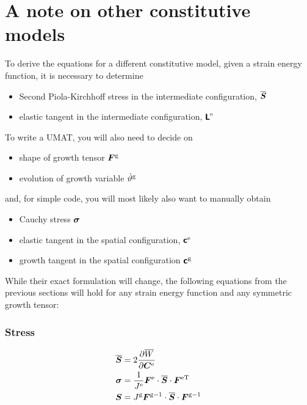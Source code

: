 \documentclass[10pt,letterpaper,oneside]{report}
\newcommand{\ten}[1]{\mbox{\boldmath $#1$}{}}
\newcommand{\tenf}[1]{\mbox{{\sffamily{\bfseries {#1}}}}}
\newcommand{\scas}[1]{\mbox{{\scriptsize{${\rm{#1}}$}}}{}}
\begin{document}
\section{A note on other constitutive models}
To derive the equations for a different constitutive model, given a strain energy function, it is necessary to determine
\begin{itemize}
\item Second Piola-Kirchhoff stress in the intermediate configuration, $\overline{ \ten{S} }$
\item elastic tangent in the intermediate configuration, $\tenf{L}^{\scas{e}}$
\end{itemize}
To write a UMAT, you will also need to decide on
\begin{itemize}
\item shape of growth tensor $\ten{F}^{\scas{g}}$
\item evolution of growth variable $\dot{\vartheta}^{\scas{g}}$
\end{itemize}
and, for simple code, you will most likely also want to manually obtain
\begin{itemize}
\item Cauchy stress $\ten{\sigma}$
\item elastic tangent in the spatial configuration, $\tenf{c}^{\scas{e}}$
\item growth tangent in the spatial configuration $\tenf{c}^{\scas{g}}$
\end{itemize}
While their exact formulation will change, the following equations from the previous sections will hold for any strain energy function and any symmetric growth tensor:
\subsubsection{Stress}
\begin{align}
\overline{\ten{S}} ={}& 2 \frac{\partial \overline{W}}{\partial \ten{C}^{\scas{e}}}  
\\
\ten{\sigma} ={}& \frac{1}{J^{\scas{e}}} \ten{F}^{\scas{e}} \cdot \overline{\ten{S}} \cdot \ten{F}^{\scas{eT}}  
\\
\ten{S} ={}& J^{\scas{g}} \ten{F}^{\scas{g}-1} \cdot \overline{\ten{S}} \cdot \ten{F}^{\scas{g}-1}
\end{align}
\end{document}
